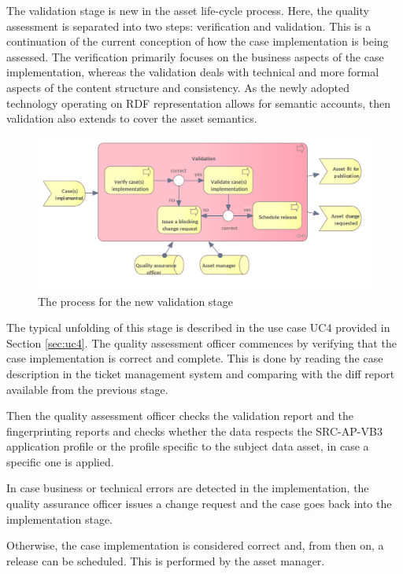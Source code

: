 	The validation stage is new in the asset life-cycle process. Here, the quality assessment is separated into two steps: verification and validation. This is a continuation of the current conception of how the case implementation is being assessed. The verification primarily focuses on the business aspects of the case implementation, whereas the validation deals with technical and more formal aspects of the content structure and consistency. As the newly adopted technology operating on RDF representation allows for semantic accounts, then validation also extends to cover the asset semantics. 	 
	\begin{figure}[h]
		\centering
		\includegraphics[width=.892\textwidth]{images/business/new/Validation.png}
		\caption{The process for the new validation stage}
		\label{fig:validation-new}
	\end{figure}

	The typical unfolding of this stage is described in the use case UC4 provided in Section \ref{sec:uc4}. The quality assessment officer commences by verifying that the case implementation is correct and complete. This is done by reading the case description in the ticket management system and comparing with the diff report available from the previous stage. 
	
	Then the quality assessment officer checks the validation report and the fingerprinting reports and checks whether the data respects the SRC-AP-VB3 application profile or the profile specific to the subject data asset, in case a specific one is applied. 
	
	In case business or technical errors are detected in the implementation, the quality assurance officer issues a  change request and the case goes back into the implementation stage. 
	\enlargethispage{1em}
	
	Otherwise, the case implementation is considered correct and, from then on, a release can be scheduled. This is performed by the asset manager. 
		
